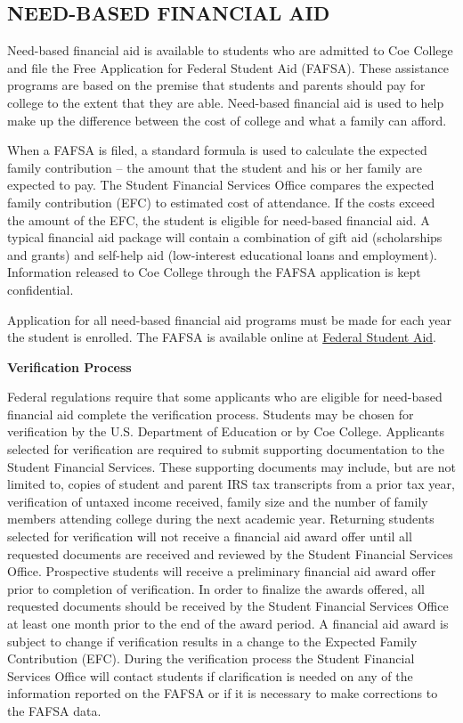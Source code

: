 \documentclass[
  letterpaper,
]{scrbook}
\begin{document}
\subsection{NEED-BASED FINANCIAL AID}\label{need-based-financial-aid}

Need-based financial aid is available to students who are admitted to
Coe College and file the Free Application for Federal Student Aid
(FAFSA). These assistance programs are based on the premise that
students and parents should pay for college to the extent that they are
able. Need-based financial aid is used to help make up the difference
between the cost of college and what a family can afford.

When a FAFSA is filed, a standard formula is used to calculate the
expected family contribution -- the amount that the student and his or
her family are expected to pay. The Student Financial Services Office
compares the expected family contribution (EFC) to estimated cost of
attendance. If the costs exceed the amount of the EFC, the student is
eligible for need-based financial aid. A typical financial aid package
will contain a combination of gift aid (scholarships and grants) and
self-help aid (low-interest educational loans and employment).
Information released to Coe College through the FAFSA application is
kept confidential.

Application for all need-based financial aid programs must be made for
each year the student is enrolled. The FAFSA is available online at
\href{www.fafsa.gov}{Federal Student Aid}.

\textbf{Verification Process}

Federal regulations require that some applicants who are eligible for
need-based financial aid complete the verification process. Students may
be chosen for verification by the U.S. Department of Education or by Coe
College. Applicants selected for verification are required to submit
supporting documentation to the Student Financial Services. These
supporting documents may include, but are not limited to, copies of
student and parent IRS tax transcripts from a prior tax year,
verification of untaxed income received, family size and the number of
family members attending college during the next academic year.
Returning students selected for verification will not receive a
financial aid award offer until all requested documents are received and
reviewed by the Student Financial Services Office. Prospective students
will receive a preliminary financial aid award offer prior to completion
of verification. In order to finalize the awards offered, all requested
documents should be received by the Student Financial Services Office at
least one month prior to the end of the award period. A financial aid
award is subject to change if verification results in a change to the
Expected Family Contribution (EFC). During the verification process the
Student Financial Services Office will contact students if clarification
is needed on any of the information reported on the FAFSA or if it is
necessary to make corrections to the FAFSA data.
\end{document}
